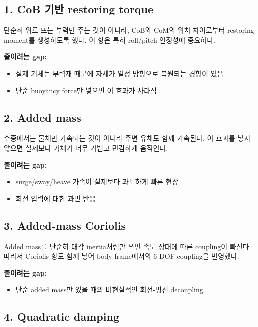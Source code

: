 \documentclass[11pt,a4paper]{article}
\begin{document}
\subsection{1. CoB 기반 restoring torque}

단순히 위로 뜨는 부력만 주는 것이 아니라, CoB와 CoM의 위치 차이로부터 restoring moment를 생성하도록 했다. 이 항은 특히 roll/pitch 안정성에 중요하다.

\textbf{줄이려는 gap:}

\begin{itemize}[leftmargin=2em]
  \item 실제 기체는 부력재 때문에 자세가 일정 방향으로 복원되는 경향이 있음
  \item 단순 buoyancy force만 넣으면 이 효과가 사라짐
\end{itemize}

\subsection{2. Added mass}

수중에서는 물체만 가속되는 것이 아니라 주변 유체도 함께 가속된다. 이 효과를 넣지 않으면 실제보다 기체가 너무 가볍고 민감하게 움직인다.

\textbf{줄이려는 gap:}

\begin{itemize}[leftmargin=2em]
  \item surge/sway/heave 가속이 실제보다 과도하게 빠른 현상
  \item 회전 입력에 대한 과민 반응
\end{itemize}

\subsection{3. Added-mass Coriolis}

Added mass를 단순히 대각 inertia처럼만 쓰면 속도 상태에 따른 coupling이 빠진다. 따라서 Coriolis 항도 함께 넣어 body-frame에서의 6-DOF coupling을 반영했다.

\textbf{줄이려는 gap:}

\begin{itemize}[leftmargin=2em]
  \item 단순 added mass만 있을 때의 비현실적인 회전-병진 decoupling
\end{itemize}

\subsection{4. Quadratic damping}
\end{document}
